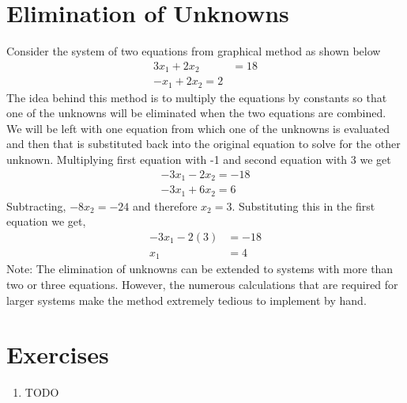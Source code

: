 \documentclass[book.tex]{subfiles}
\begin{document}
\section{Elimination of Unknowns}
Consider the system of two equations from graphical method as shown below
\begin{align}
3x_1 + 2x_2 &= 18\\
-x_1 + 2x_2 = 2
\end{align}
The idea behind this method is to multiply the equations by constants so that one of the unknowns will be eliminated when the two equations are combined. We will be left with one equation from which one of the unknowns is evaluated and then that is substituted back into the original equation to solve for the other unknown. Multiplying first equation with -1 and second equation with 3 we get
\begin{align}
-3x_1 - 2x_2 = -18\\
-3x_1 + 6x_2 = 6
\end{align}
Subtracting, $-8x_2 = -24$ and therefore $x_2 = 3$. Substituting this in the first equation we get,
\begin{align}
-3x_1 - 2(3) &= -18\\
x_1 &= 4
\end{align}
Note: The elimination of unknowns can be extended to systems with more than two or three equations. However, the numerous calculations that are required for larger systems make the method extremely tedious to implement by hand.

\section{Exercises}
\begin{enumerate}
    \item TODO
\end{enumerate}
\end{document}
